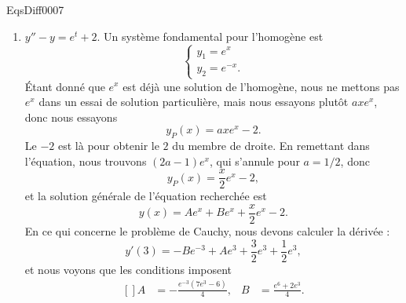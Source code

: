 \begin{corrige}{EqsDiff0007}
\begin{enumerate}
\item
$y''-y=e^t+2$. Un système fondamental pour l'homogène est
\begin{equation}
	\left\{
\begin{array}{ll}
y_1=e^x\\
y_2= e^{-x}.
\end{array}
\right.
\end{equation}
Étant donné que $e^x$ est déjà une solution de l'homogène, nous ne mettons pas $e^x$ dans un essai de solution particulière, mais nous essayons plutôt $axe^x$, donc nous essayons
\begin{equation}
	y_P(x)=axe^x-2.
\end{equation}
Le $-2$ est là pour obtenir le $2$ du membre de droite. En remettant dans l'équation, nous trouvons $(2a-1)e^x$, qui s'annule pour $a=1/2$, donc
\begin{equation}
	y_P(x)=\frac{ x }{ 2 }e^x-2,
\end{equation}
et la solution générale de l'équation recherchée est
\begin{equation}
	y(x)=Ae^x+Be^x+\frac{ x }{ 2 }e^x-2.
\end{equation}
En ce qui concerne le problème de Cauchy, nous devons calculer la dérivée :
\begin{equation}
	y'(3)=-B e^{-3}+A e^{3}+\frac{ 3 }{ 2 }e^3+\frac{ 1 }{2}e^3,
\end{equation}
et nous voyons que les conditions imposent 
\begin{equation}
	\begin{aligned}[]
		A&=-\frac{ e^{-3}(7e^3-6) }{ 4 },&B&=\frac{ e^6+2e^3 }{ 4 }.
	\end{aligned}
\end{equation}


\end{enumerate}
\end{corrige}
